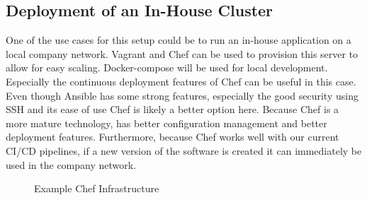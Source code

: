 \subsection{Deployment of an In-House Cluster}
One of the use cases for this setup could be to run an in-house application on a local company network. Vagrant and Chef can be used to provision this server to allow for easy scaling. Docker-compose will be used for local development. Especially the continuous deployment features of Chef can be useful in this case\cite{ansible-vs-chef2}. Even though Ansible has some strong features, especially the good security using SSH and its ease of use Chef is likely a better option here. Because Chef is a more mature technology\cite{ansible-vs-chef}, has better configuration management and better deployment features. Furthermore, because Chef works well with our current CI/CD pipelines, if a new version of the software is created it can immediately be used in the company network. 

\begin{figure}[h]
    \centering
    \caption{Example Chef Infrastructure}
    \label{fig:chef-infrastructure}
\end{figure}


